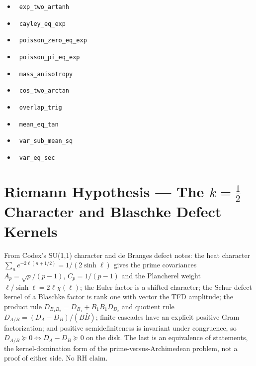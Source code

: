\documentclass{report}
\theoremstyle{definition}
\begin{document}
\begin{itemize}
  \item {}\leanok\ \texttt{exp\_two\_artanh}
  \item {}\leanok\ \texttt{cayley\_eq\_exp}
  \item {}\leanok\ \texttt{poisson\_zero\_eq\_exp}
  \item {}\leanok\ \texttt{poisson\_pi\_eq\_exp}
  \item {}\leanok\ \texttt{mass\_anisotropy}
  \item {}\leanok\ \texttt{cos\_two\_arctan}
  \item {}\leanok\ \texttt{overlap\_trig}
  \item {}\leanok\ \texttt{mean\_eq\_tan}
  \item {}\leanok\ \texttt{var\_sub\_mean\_sq}
  \item {}\leanok\ \texttt{var\_eq\_sec}
\end{itemize}

\section{Riemann Hypothesis --- The $k=\tfrac12$ Character and Blaschke Defect Kernels}
From Codex's SU(1,1) character and de Branges defect notes: the heat character $\sum_n e^{-2\ell(n+1/2)}=1/(2\sinh\ell)$ gives the prime covariances $A_p=\sqrt p/(p-1)$, $C_p=1/(p-1)$ and the Plancherel weight $\ell/\sinh\ell=2\ell\chi(\ell)$; the Euler factor is a shifted character; the Schur defect kernel of a Blaschke factor is rank one with vector the TFD amplitude; the product rule $D_{B_1B_2}=D_{B_1}+B_1\bar B_1D_{B_2}$ and quotient rule $D_{A/B}=(D_A-D_B)/(B\bar B)$; finite cascades have an explicit positive Gram factorization; and positive semidefiniteness is invariant under congruence, so $D_{A/B}\succeq0\iff D_A-D_B\succeq0$ on the disk. The last is an equivalence of statements, the kernel-domination form of the prime-versus-Archimedean problem, not a proof of either side. No RH claim.
\end{document}
